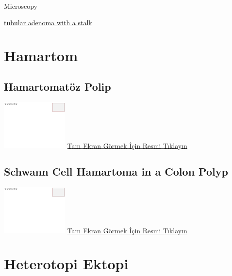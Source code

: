 \documentclass[
  letterpaper,
  paper=6in:9in,
  pagesize=pdftex,
  headinclude=on,
  footinclude=on,
  12pt]{scrbook}
\begin{document}
Microscopy

\href{https://images.patolojiatlasi.com/tubularadenoma/tubular-adenoma-with-stalk.jpeg}{tubular
adenoma with a stalk}

\hypertarget{sec-hamartom}{%
\chapter{Hamartom}\label{sec-hamartom}}

\hypertarget{sec-hamartomatoz-polip}{%
\section{Hamartomatöz Polip}\label{sec-hamartomatoz-polip}}

\href{https://images.patolojiatlasi.com/template/HE.html}{\includegraphics[width=0.25\textwidth,height=\textheight]{./screenshots/template_screenshot.png}}
\href{https://images.patolojiatlasi.com/hamartomatouspolyp/HE.html}{Tam
Ekran Görmek İçin Resmi Tıklayın}

\hypertarget{sec-schwann-cell-hamartoma-colon-polyp}{%
\section{Schwann Cell Hamartoma in a Colon
Polyp}\label{sec-schwann-cell-hamartoma-colon-polyp}}

\href{https://images.patolojiatlasi.com/template/HE.html}{\includegraphics[width=0.25\textwidth,height=\textheight]{./screenshots/template_screenshot.png}}
\href{https://images.patolojiatlasi.com/schwanncellhamartoma/HE.html}{Tam
Ekran Görmek İçin Resmi Tıklayın}

\hypertarget{sec-heterotopi-ektopi}{%
\chapter{Heterotopi Ektopi}\label{sec-heterotopi-ektopi}}
\end{document}
